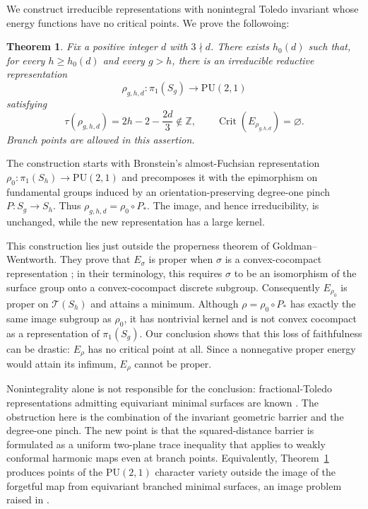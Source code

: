\documentclass[12pt]{amsart}
\newtheorem{theorem}{Theorem}[section]
\theoremstyle{remark}
\newcommand{\Teich}{\mathcal T}
\newcommand{\PU}{\mathrm{PU}}
\begin{document}
We construct irreducible representations with nonintegral Toledo invariant
whose energy functions have no critical points.  We prove the followoing: 

\begin{theorem}\label{thm:main}
Fix a positive integer $d$ with $3\nmid d$.  There exists $h_0(d)$ such that,
for every $h\ge h_0(d)$ and every $g>h$, there is an irreducible reductive
representation
\[
 \rho_{g,h,d}:\pi_1(S_g)\longrightarrow\PU(2,1)
\]
satisfying
\begin{equation}\label{eq:toledo-main}
 \tau(\rho_{g,h,d})=2h-2-\frac{2d}{3}\notin\mathbb Z,
 \qquad
 \operatorname{Crit}(E_{\rho_{g,h,d}})=\varnothing.
\end{equation}
Branch points are allowed in this assertion.
\end{theorem}

The construction starts with Bronstein's almost-Fuchsian representation
$\rho_0:\pi_1(S_h)\to\PU(2,1)$ and precomposes it with the epimorphism on
fundamental groups induced by an orientation-preserving degree-one pinch
$P:S_g\to S_h$.  Thus $\rho_{g,h,d}=\rho_0\circ P_*$.  The image, and hence
irreducibility, is unchanged, while the new representation has a large kernel.

This construction lies just outside the properness theorem of
Goldman--Wentworth.  They prove that $E_\sigma$ is proper when $\sigma$ is a
convex-cocompact representation \cite[Theorem~A]{GoldmanWentworth}; in their
terminology, this requires $\sigma$ to be an isomorphism of the surface group
onto a convex-cocompact discrete subgroup.  Consequently $E_{\rho_0}$ is
proper on $\Teich(S_h)$ and attains a minimum.  Although
$\rho=\rho_0\circ P_*$ has exactly the same image subgroup as $\rho_0$, it has
nontrivial kernel and is not convex cocompact as a representation of
$\pi_1(S_g)$.  Our conclusion shows that this loss of faithfulness can be
drastic: $E_\rho$ has no critical point at all.  Since a nonnegative proper
energy would attain its infimum, $E_\rho$ cannot be proper.


Nonintegrality alone is not responsible for the conclusion: fractional-Toledo
representations admitting equivariant minimal surfaces are known
\cite{BronsteinPU,LoftinMcIntosh}.  The obstruction here is the combination of
the invariant geometric barrier and the degree-one pinch.  The new point is
that the squared-distance barrier is formulated as a uniform two-plane trace
inequality that applies to weakly conformal harmonic maps even at branch
points.  Equivalently, Theorem~\ref{thm:main} produces points of the
$\PU(2,1)$ character variety outside the image of the forgetful map from
equivariant branched minimal surfaces, an image problem raised in
\cite[Section~6.3]{LoftinMcIntosh}.
\end{document}
